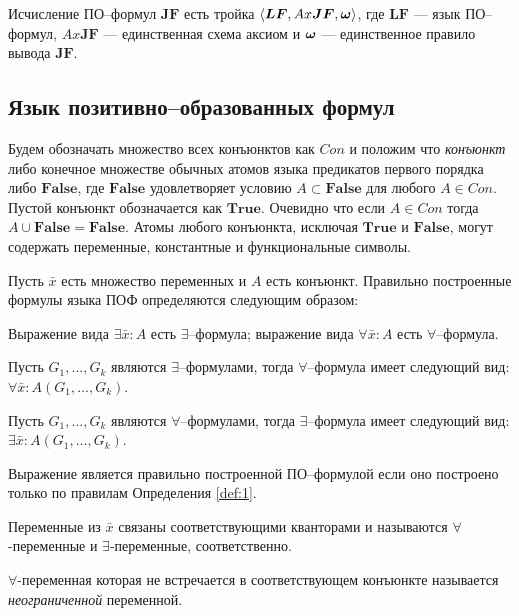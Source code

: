 Исчисление ПО--формул $\boldsymbol{JF}$ есть тройка $\left\langle \boldsymbol{LF}, Ax\boldsymbol{JF}, \boldsymbol{\omega} \right\rangle$, где $\boldsymbol{LF}$ --- язык ПО--формул, $Ax\boldsymbol{JF}$ --- единственная схема аксиом и $\boldsymbol{\omega}$ --- единственное правило вывода $\boldsymbol{JF}.$

\subsection{Язык позитивно--образованных формул}

Будем обозначать множество всех конъюнктов как $Con$ и положим что {\em конъюнкт} либо конечное множестве обычных атомов языка предикатов первого порядка либо $\boldsymbol{False}$, где $\boldsymbol{False}$ удовлетворяет условию $A \subset \boldsymbol{False} $ для любого $A \in Con$. Пустой конъюнкт обозначается как $\boldsymbol{True}$. Очевидно что если $A \in Con$ тогда $A \cup \boldsymbol{False} = \boldsymbol{False}$. Атомы любого конъюнкта, исключая $\boldsymbol{True}$ и $\boldsymbol{False}$, могут содержать переменные, константные и функциональные символы.

\begin{definition}\label{def:1}
Пусть $\bar{x}$ есть множество переменных и $A$ есть конъюнкт. Правильно построенные формулы языка ПОФ определяются следующим образом:

Выражение вида $\exists \bar{x}\colon A$ есть $\exists$--формула; выражение вида $\forall \bar{x}\colon A$ есть $\forall$--формула.

Пусть $G_1,\ldots,G_k$ являются $\exists$--формулами, тогда $\forall$--формула имеет следующий вид: $\forall \bar{x}\colon A\left(G_1,\ldots,G_k\right)$.

Пусть $G_1,\ldots,G_k$ являются $\forall$--формулами, тогда $\exists$--формула имеет следующий вид: $\exists \bar{x}\colon A\left(G_1,\ldots,G_k\right)$.

\end{definition}

Выражение является правильно построенной ПО--формулой если оно построено только по правилам Определения \ref{def:1}.

Переменные из $\bar{x}$ связаны соответствующими кванторами и называются $\forall$-переменные и $\exists$-переменные, соответственно.

$\forall$-переменная которая не встречается в соответствующем конъюнкте называется {\em неограниченной} переменной.

